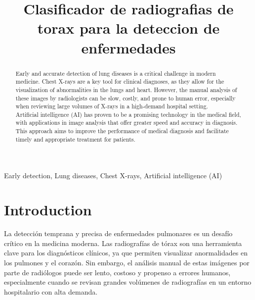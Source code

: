 \documentclass[conference]{IEEEtran}
\begin{document}
\title{Clasificador de radiografias de torax para la deteccion de enfermedades\\


}

\author{
\and
{}
}

\maketitle

\begin{abstract}
Early and accurate detection of lung diseases is a critical challenge in modern medicine. Chest X-rays are a key tool for clinical diagnoses, as they allow for the visualization of abnormalities in the lungs and heart. However, the manual analysis of these images by radiologists can be slow, costly, and prone to human error, especially when reviewing large volumes of X-rays in a high-demand hospital setting.\\

Artificial intelligence (AI) has proven to be a promising technology in the medical field, with applications in image analysis that offer greater speed and accuracy in diagnosis. This approach aims to improve the performance of medical diagnosis and facilitate timely and appropriate treatment for patients.
\end{abstract}

\begin{IEEEkeywords}
Early detection, Lung diseases, Chest X-rays, Artificial intelligence (AI)
\end{IEEEkeywords}

\section{Introduction}
La detección temprana y precisa de enfermedades pulmonares es un desafío crítico en la medicina moderna. Las radiografías de tórax son una herramienta clave para los diagnósticos clínicos, ya que permiten visualizar anormalidades en los pulmones y el corazón. Sin embargo, el análisis manual de estas imágenes por parte de radiólogos puede ser lento, costoso y propenso a errores humanos, especialmente cuando se revisan grandes volúmenes de radiografías en un entorno hospitalario con alta demanda.\\
\end{document}
